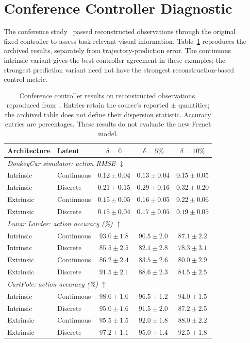 \documentclass[preprint,12pt]{elsarticle}
\begin{document}
\section{Conference Controller Diagnostic}\label{sec:conf_control}
The conference study~\cite{piwm_conf} passed reconstructed observations through
the original fixed controller to assess task-relevant visual information.
Table~\ref{tab:conf_control} reproduces the archived results, separately from
trajectory-prediction error. The continuous intrinsic variant gives the best
controller agreement in these examples; the strongest prediction variant need
not have the strongest reconstruction-based control metric.

\begin{table}[htbp]
\centering
\caption{Conference controller results on reconstructed observations, reproduced
from~\cite{piwm_conf}. Entries retain the source's reported $\pm$ quantities;
the archived table does not define their dispersion statistic. Accuracy entries
are percentages. These results do not evaluate the new Frenet model.}
\label{tab:conf_control}
\small
\setlength{\tabcolsep}{5pt}
\begin{tabular}{@{}llccc@{}}
\toprule
Architecture & Latent & $\delta=0$ & $\delta=5\%$ & $\delta=10\%$ \\
\midrule
\multicolumn{5}{l}{\textit{DonkeyCar simulator: action RMSE $\downarrow$}}\\[2pt]
Intrinsic & Continuous & $0.12\pm0.04$ & $0.13\pm0.04$ & $0.15\pm0.05$\\
Intrinsic & Discrete   & $0.21\pm0.15$ & $0.29\pm0.16$ & $0.32\pm0.20$\\
Extrinsic & Continuous & $0.15\pm0.05$ & $0.16\pm0.05$ & $0.22\pm0.06$\\
Extrinsic & Discrete   & $0.15\pm0.04$ & $0.17\pm0.05$ & $0.19\pm0.05$\\
\midrule
\multicolumn{5}{l}{\textit{Lunar Lander: action accuracy (\%) $\uparrow$}}\\[2pt]
Intrinsic & Continuous & $93.0\pm1.8$ & $90.5\pm2.0$ & $87.1\pm2.2$\\
Intrinsic & Discrete   & $85.5\pm2.5$ & $82.1\pm2.8$ & $78.3\pm3.1$\\
Extrinsic & Continuous & $86.2\pm2.4$ & $83.5\pm2.6$ & $80.0\pm2.9$\\
Extrinsic & Discrete   & $91.5\pm2.1$ & $88.6\pm2.3$ & $84.5\pm2.5$\\
\midrule
\multicolumn{5}{l}{\textit{CartPole: action accuracy (\%) $\uparrow$}}\\[2pt]
Intrinsic & Continuous & $98.0\pm1.0$ & $96.5\pm1.2$ & $94.0\pm1.5$\\
Intrinsic & Discrete   & $95.0\pm1.6$ & $91.5\pm2.0$ & $87.2\pm2.5$\\
Extrinsic & Continuous & $95.5\pm1.5$ & $92.0\pm1.8$ & $88.0\pm2.2$\\
Extrinsic & Discrete   & $97.2\pm1.1$ & $95.0\pm1.4$ & $92.5\pm1.8$\\
\bottomrule
\end{tabular}
\end{table}



\end{document}
